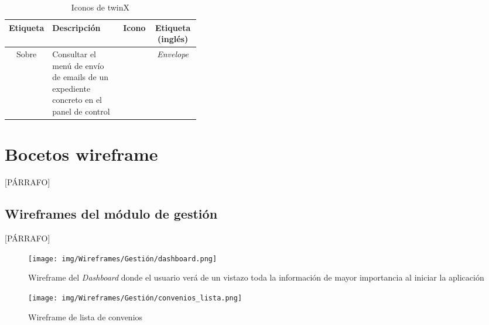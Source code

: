 \begin{table}[h]
	\begin{center}
			\begin{tabular}{ | c | >{\centering\arraybackslash}p{0.375\linewidth} | c | c | } 
				\hline
				Etiqueta & Descripción & Icono & Etiqueta (inglés) \\
				\hline
				Sobre & Consultar el menú de envío de emails de un expediente concreto en el panel de control & \pbox{4cm}{\bigskip \huge\faEnvelope}  & \textit{Envelope} \\ 
				\hline
			
			\end{tabular}
	\caption{Iconos de twinX}
	\label{tab:iconografia}
	\end{center}
\end{table}

\section{Bocetos wireframe}

[PÁRRAFO]

\subsection{Wireframes del módulo de gestión}

[PÁRRAFO]

\begin{figure}
	\centering
	\texttt{[image: img/Wireframes/Gestión/dashboard.png]}
	\caption[Wireframe de \textit{Dashboard}]{Wireframe del \textit{Dashboard} donde el usuario verá de un vistazo toda la información de mayor importancia al iniciar la aplicación}
	\label{fig:dashboardWF}
\end{figure}

\begin{figure}
	\centering
	\texttt{[image: img/Wireframes/Gestión/convenios\_lista.png]}
	\caption{Wireframe de lista de convenios}
	\label{fig:convenios_listaWF}
\end{figure}

